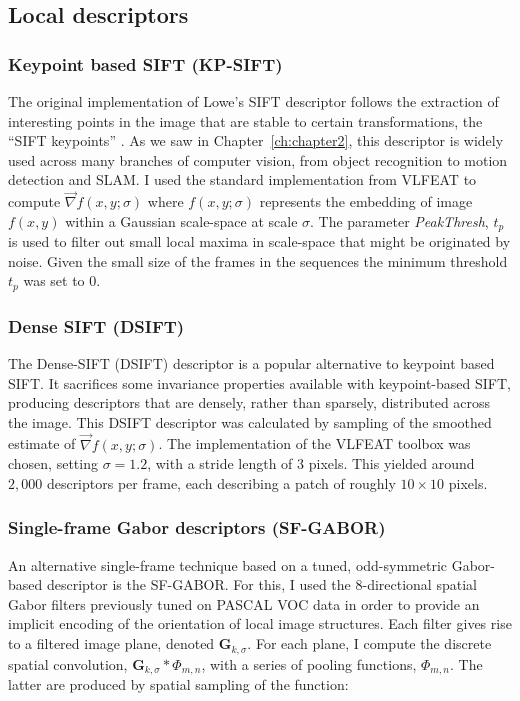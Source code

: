 \subsection{Local descriptors}
\label{sec:descriptors}

\subsubsection{Keypoint based SIFT (KP-SIFT)}

The original implementation of Lowe's SIFT descriptor follows the extraction of interesting points in the image that are stable to certain transformations, the ``SIFT keypoints'' \cite{Lowe2004}. As we saw in Chapter~\ref{ch:chapter2}, this descriptor is widely used across many branches of computer vision, from object recognition to motion detection and SLAM. I used the standard implementation from VLFEAT \cite{Vedaldi2008} to compute $\vec{\nabla}f(x,y;\sigma)$ where $f(x,y;\sigma)$ represents the embedding of image $f(x,y)$ within a Gaussian scale-space at scale $\sigma$. The parameter \emph{PeakThresh}, $t_p$ is used to filter out small local maxima in scale-space that might be originated by noise. Given the small size of the frames in the sequences the minimum threshold $t_p$ was set to $0$.

\subsubsection{Dense SIFT (DSIFT)}

The Dense-SIFT (DSIFT) descriptor \citep{Lazebnik2006} is a popular  alternative to keypoint based SIFT. It sacrifices some invariance properties available with keypoint-based SIFT, producing descriptors that are densely, rather than sparsely, distributed across the image. This DSIFT descriptor was calculated by  sampling of the smoothed estimate of $\vec{\nabla}f(x,y;\sigma)$.  The implementation of the VLFEAT toolbox was chosen, setting $\sigma = 1.2$, with a stride length of 3 pixels. This  yielded around $2,000$ descriptors per frame, each describing a patch of roughly $10 \times 10$ pixels.

\subsubsection{Single-frame Gabor descriptors (SF-GABOR)}
\label{sec:sf-gabor}

An alternative single-frame technique based on a tuned, odd-symmetric Gabor-based descriptor is the SF-GABOR. For this, I used the $8$-directional spatial Gabor filters previously tuned on PASCAL VOC data \cite{Everingham2009} in order to provide an implicit encoding of the orientation of local image structures.  Each filter gives rise to a filtered image plane, denoted $\mathbf{G}_{k,\sigma}$.  For each plane, I compute the discrete spatial convolution, $\mathbf{G}_{k,\sigma} \ast {\Phi}_{m,n}$, with a series of pooling functions, ${\Phi}_{m,n}$. The latter are produced by spatial sampling of the function:

